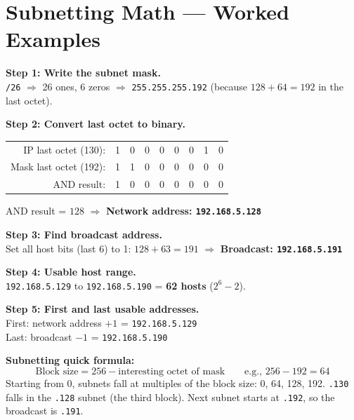\documentclass[11pt, letterpaper]{article}
\begin{document}
\section*{Subnetting Math --- Worked Examples}

\begin{tcolorbox}[colback=partbg, colframe=sectionblue,
  title={\bfseries Given: \texttt{192.168.5.130/26} --- find network, broadcast, and host range}, arc=3pt, boxrule=1pt]
\textbf{Step 1: Write the subnet mask.}\\
\texttt{/26} $\Rightarrow$ 26 ones, 6 zeros $\Rightarrow$ \texttt{255.255.255.192}
(because $128+64=192$ in the last octet).

\textbf{Step 2: Convert last octet to binary.}
\begin{center}
\renewcommand{\arraystretch}{1.1}
\begin{tabular}{r|cccccccc}
IP last octet (130): & 1 & 0 & 0 & 0 & 0 & 0 & 1 & 0 \\
Mask last octet (192): & 1 & 1 & 0 & 0 & 0 & 0 & 0 & 0 \\
AND result: & 1 & 0 & 0 & 0 & 0 & 0 & 0 & 0 \\
\end{tabular}
\end{center}
AND result = $128$ $\Rightarrow$ \textbf{Network address: \texttt{192.168.5.128}}

\textbf{Step 3: Find broadcast address.}\\
Set all host bits (last 6) to 1: $128 + 63 = 191$
$\Rightarrow$ \textbf{Broadcast: \texttt{192.168.5.191}}

\textbf{Step 4: Usable host range.}\\
\texttt{192.168.5.129} to \texttt{192.168.5.190} = \textbf{62 hosts} ($2^6 - 2$).

\textbf{Step 5: First and last usable addresses.}\\
First: network address $+1$ = \texttt{192.168.5.129}\\
Last: broadcast $-1$ = \texttt{192.168.5.190}
\end{tcolorbox}

\begin{tcolorbox}[colback=notebg, colframe=noteborder, arc=3pt, boxrule=1pt]
\textbf{Subnetting quick formula:}
\[
  \text{Block size} = 256 - \text{interesting octet of mask}
  \qquad \text{e.g., } 256 - 192 = 64
\]
Starting from 0, subnets fall at multiples of the block size: 0, 64, 128, 192.
\texttt{.130} falls in the \texttt{.128} subnet (the third block). Next subnet starts at
\texttt{.192}, so the broadcast is \texttt{.191}.
\end{tcolorbox}
\end{document}
